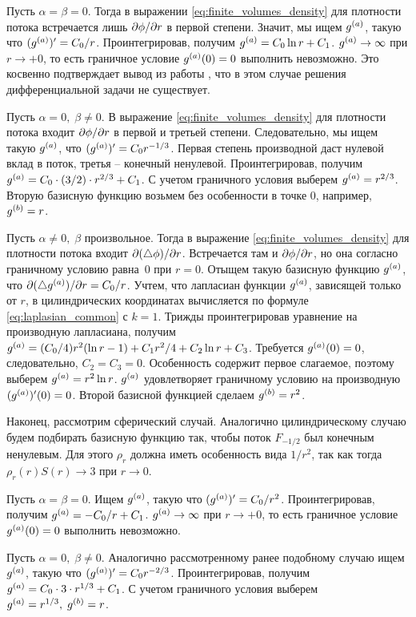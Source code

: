 Пусть $\alpha = \beta = 0$. Тогда в выражении \eqref{eq:finite_volumes_density} для плотности потока встречается лишь $\partial \phi / \partial r$ в первой степени. Значит, мы ищем ${g^{(a)}}$, такую что $({g^{(a)}})' = C_0/r$. Проинтегрировав, получим ${g^{(a)}} = C_0 \ln r + C_1$. ${g^{(a)}} \to \infty$ при $r \to +0$, то есть граничное условие ${g^{(a)}}(0) = 0$ выполнить невозможно. Это косвенно подтверждает вывод из работы \cite{zipunova_higher_codimension}, что в этом случае решения дифференциальной задачи не существует.

Пусть $\alpha = 0, \; \beta \neq 0$. В выражение \eqref{eq:finite_volumes_density} для плотности потока входит $\partial \phi / \partial r$ в первой и третьей степени. Следовательно, мы ищем такую ${g^{(a)}}$, что $({g^{(a)}})' = C_0 r^{-1/3}$. Первая степень производной даст нулевой вклад в поток, третья -- конечный ненулевой. Проинтегрировав, получим ${g^{(a)}} = C_0 \cdot (3/2) \cdot r^{2/3} + C_1$. С учетом граничного условия выберем ${g^{(a)}} = r^{2/3}$. Вторую базисную функцию возьмем без особенности в точке $0$, например, ${g^{(b)}} = r$.

Пусть $\alpha \neq 0, \; \beta$ произвольное. Тогда в выражение \eqref{eq:finite_volumes_density} для плотности потока входит $\partial (\triangle \phi) / \partial r$. Встречается там и $\partial \phi / \partial r$, но она согласно граничному условию равна~$0$ при $r = 0$. Отыщем такую базисную функцию ${g^{(a)}}$, что $\partial (\triangle {g^{(a)}}) / \partial r = C_0 / r$. Учтем, что лапласиан функции ${g^{(a)}}$, зависящей только от $r$, в цилиндрических координатах вычисляется по формуле \eqref{eq:laplasian_common} с $k = 1$. Трижды проинтегрировав уравнение на производную лапласиана, получим ${g^{(a)}} = (C_0/4) r^2 (\ln r - 1) + C_1 r^2 / 4 + C_2 \ln r + C_3$. Требуется ${g^{(a)}}(0) = 0$, следовательно, $C_2 = C_3 = 0$. Особенность содержит первое слагаемое, поэтому выберем ${g^{(a)}} = r^2 \ln r$. ${g^{(a)}}$ удовлетворяет граничному условию на производную $({g^{(a)}})'(0) = 0$. Второй базисной функцией сделаем ${g^{(b)}} = r^2$.

Наконец, рассмотрим сферический случай. Аналогично цилиндрическому случаю будем подбирать базисную функцию так, чтобы поток $F_{-1/2}$ был конечным ненулевым. Для этого $\rho_r$ должна иметь особенность вида $1/r^2$, так как тогда $\rho_r(r) S(r) \to 3$ при $r \to 0$.

Пусть $\alpha = \beta = 0$. Ищем ${g^{(a)}}$, такую что $({g^{(a)}})' = C_0 / r^2$. Проинтегрировав, получим ${g^{(a)}} = -C_0 / r + C_1$. ${g^{(a)}} \to \infty$ при $r \to +0$, то есть граничное условие ${g^{(a)}}(0) = 0$ выполнить невозможно.

Пусть $\alpha = 0, \; \beta \neq 0$. Аналогично рассмотренному ранее подобному случаю ищем ${g^{(a)}}$, такую что $({g^{(a)}})' = C_0 r^{-2/3}$. Проинтегрировав, получим ${g^{(a)}} = C_0 \cdot 3 \cdot r^{1/3} + C_1$. С учетом граничного условия выберем ${g^{(a)}} = r^{1/3}, \; {g^{(b)}} = r$.

